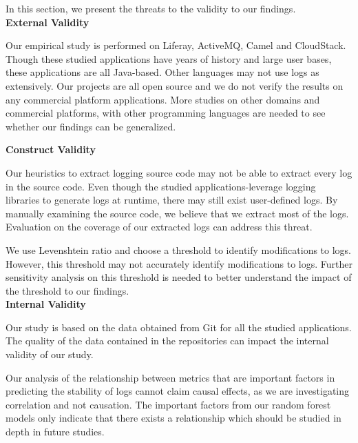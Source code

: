 In this section, we present the threats to the validity to our findings. \\


\noindent \textbf{External Validity}

Our empirical study is performed on Liferay, ActiveMQ, Camel and CloudStack. Though these studied applications have years of history and large user bases, these applications are all Java-based. Other languages may not use logs as extensively. Our projects are all open source and we do not verify the results on any commercial platform applications. More studies on other domains and commercial platforms, with other programming languages are needed to see whether our findings can be generalized. 



\noindent \textbf{Construct Validity}


Our heuristics to extract logging source code may not be able to extract every log in the source code. Even though the studied applications-leverage logging libraries to generate logs at runtime, there may still exist user-defined logs. By manually examining the source code, we believe that we extract most of the logs. Evaluation on the coverage of our extracted logs can address this threat.



We use Levenshtein ratio and choose a threshold to identify modifications to logs. However, this threshold may not accurately identify modifications to logs. Further sensitivity analysis on this threshold is needed to better understand the impact of the threshold to our findings. \\


\noindent \textbf{Internal Validity}

Our study is based on the data obtained from Git for all the studied applications. The quality of the data contained in the repositories can impact the internal validity of our study.

Our analysis of the relationship between metrics that are important factors in predicting the stability of logs cannot claim causal effects, as we are investigating correlation and not causation. The important factors from our random forest models only indicate that there exists a relationship which should be studied in depth in future studies. 




